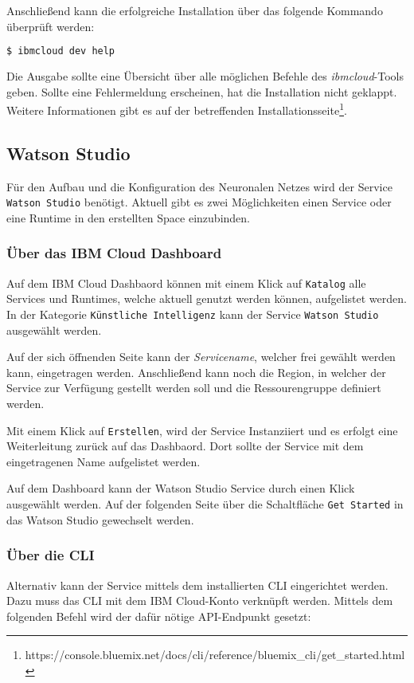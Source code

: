 Anschließend kann die erfolgreiche Installation über das folgende Kommando überprüft werden:

\begin{lstlisting}[language=bash, caption=Installation des CLI überprüfen, label=Installation des CLI überprüfen]
    $ ibmcloud dev help
\end{lstlisting}

Die Ausgabe sollte eine Übersicht über alle möglichen Befehle des \textit{ibmcloud}-Tools geben. Sollte eine Fehlermeldung
erscheinen, hat die Installation nicht geklappt. Weitere Informationen gibt es auf der betreffenden
Installationsseite\footnote{https://console.bluemix.net/docs/cli/reference/bluemix\_cli/get\_started.html}.

\subsection{Watson Studio}
Für den Aufbau und die Konfiguration des Neuronalen Netzes wird der Service \texttt{Watson Studio} benötigt. Aktuell gibt
es zwei Möglichkeiten einen Service oder eine Runtime in den erstellten Space einzubinden.

\subsubsection*{Über das IBM Cloud Dashboard}
Auf dem IBM Cloud Dashbaord können mit einem Klick auf \texttt{Katalog} alle Services und Runtimes, welche aktuell genutzt
werden können, aufgelistet werden. In der Kategorie \texttt{Künstliche Intelligenz} kann der Service \texttt{Watson Studio}
ausgewählt werden.

Auf der sich öffnenden Seite kann der \textit{Servicename}, welcher frei gewählt werden kann, eingetragen werden.
Anschließend kann noch die Region, in welcher der Service zur Verfügung gestellt werden soll und die Ressourengruppe
definiert werden.

Mit einem Klick auf \texttt{Erstellen}, wird der Service Instanziiert und es erfolgt eine Weiterleitung zurück auf das
Dashbaord. Dort sollte der Service mit dem eingetragenen Name aufgelistet werden.

Auf dem Dashboard kann der Watson Studio Service durch einen Klick ausgewählt werden. Auf der folgenden Seite über die
Schaltfläche \texttt{Get Started} in das Watson Studio gewechselt werden.

\subsubsection*{Über die CLI}
Alternativ kann der Service mittels dem installierten CLI eingerichtet werden. Dazu muss das CLI mit dem IBM
Cloud-Konto verknüpft werden. Mittels dem folgenden Befehl wird der dafür nötige API-Endpunkt gesetzt:

